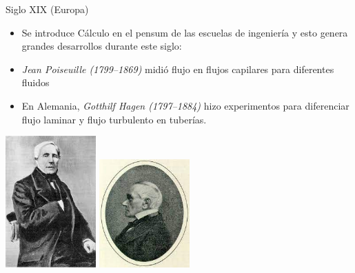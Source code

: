 \documentclass [xcolor=svgnames, t] {beamer}
\begin{document}
\begin{frame}{Siglo XIX (Europa)}
\vspace{-0.4cm}
\begin{exampleblock}{}
\begin{itemize}
\item Se introduce C\'alculo en el pensum de las escuelas de ingeniería y esto genera grandes desarrollos durante este siglo:
\item \emph{Jean Poiseuille (1799–1869)} midió flujo en flujos capilares para diferentes fluidos
\item En Alemania, \emph{Gotthilf Hagen (1797–1884)} hizo experimentos para diferenciar flujo laminar y flujo turbulento en tuberías.
\end{itemize}
\end{exampleblock}
\begin{center}
\includegraphics[width=0.26\textwidth]{poise}\hspace{2cm}
\includegraphics[width=0.26\textwidth]{hagen}
\end{center}
\end{frame}
\end{document}
